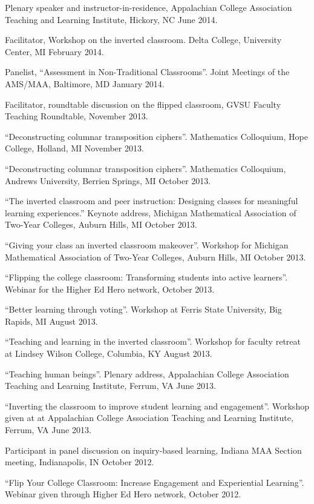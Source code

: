 \documentclass[letterpaper]{article}
\renewenvironment{itemize}{
  \begin{list}{}{
    \setlength{\leftmargin}{1.5em}
	\setlength{\itemsep}{0in}
  }
}{
  \end{list}
}
\begin{document}
\begin{itemize}
	\item Plenary speaker and instructor-in-residence, Appalachian College Association Teaching and Learning Institute, Hickory, NC June 2014. 
	\item Facilitator, Workshop on the inverted classroom. Delta College, University Center, MI February 2014. 
	\item Panelist, ``Assessment in Non-Traditional Classrooms''. Joint Meetings of the AMS/MAA, Baltimore, MD January 2014. 
	\item Facilitator, roundtable discussion on the flipped classroom, GVSU Faculty Teaching Roundtable, November 2013. 
	\item ``Deconstructing columnar transposition ciphers''. Mathematics Colloquium, Hope College, Holland, MI November 2013. 
	\item ``Deconstructing columnar transposition ciphers''. Mathematics Colloquium, Andrews University, Berrien Springs, MI October 2013.
	\item ``The inverted classroom and peer instruction: Designing classes for meaningful learning experiences.'' Keynote address, Michigan Mathematical Association of Two-Year Colleges, Auburn Hills, MI October 2013. 
	\item ``Giving your class an inverted classroom makeover''. Workshop for Michigan Mathematical Association of Two-Year Colleges, Auburn Hills, MI October 2013. 
	\item ``Flipping the college classroom: Transforming students into active learners''. Webinar for the Higher Ed Hero network, October 2013. 
	\item ``Better learning through voting''. Workshop at Ferris State University, Big Rapids, MI August 2013.
	\item ``Teaching and learning in the inverted classroom''. Workshop for faculty retreat at Lindsey Wilson College, Columbia, KY August 2013. 
	\item ``Teaching human beings''. Plenary address, Appalachian College Association Teaching and Learning Institute, Ferrum, VA June 2013. 
	\item ``Inverting the classroom to improve student learning and engagement''. Workshop given at at Appalachian College Association Teaching and Learning Institute, Ferrum, VA June 2013. 
	\item Participant in panel discussion on inquiry-based learning, Indiana MAA Section meeting, Indianapolis, IN October 2012. 
	\item ``Flip Your College Classroom: Increase Engagement and Experiential Learning''. Webinar given through Higher Ed Hero network, October 2012.

\end{itemize}
\end{document}

